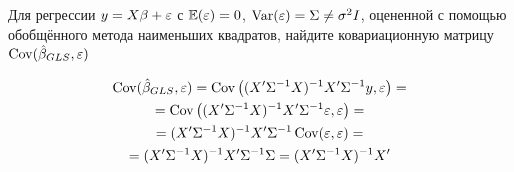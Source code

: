 \begin{problem}
Для регрессии $y = X\beta + \varepsilon$ с $\mathbb{E}(\varepsilon) = 0$, $\operatorname{Var}(\varepsilon) = \Sigma \neq \sigma^2 I$, оцененной с помощью обобщённого метода наименьших квадратов, найдите ковариационную матрицу $\operatorname{Cov}(\hat{\beta}_{GLS}, \varepsilon)$



\begin{sol}
\begin{multline*}
\operatorname{Cov}(\hat{\beta}_{GLS}, \varepsilon) = \operatorname{Cov} \left( (X' \Sigma^{-1} X)^{-1} X' \Sigma^{-1} y, \varepsilon \right) = \\
= \operatorname{Cov} \left( (X' \Sigma^{-1} X)^{-1} X' \Sigma^{-1} \varepsilon, \varepsilon \right) = \\
= (X' \Sigma^{-1} X)^{-1} X' \Sigma^{-1} \operatorname{Cov}(\varepsilon, \varepsilon) =\\
= (X' \Sigma^{-1} X)^{-1} X' \Sigma^{-1} \Sigma = (X' \Sigma^{-1} X)^{-1} X'
\end{multline*}
\end{sol}
\end{problem}



